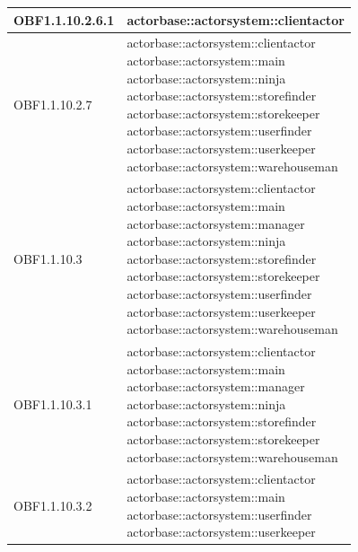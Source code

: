 \documentclass{scalatekids-article}
\begin{document}
\begin{longtable}[H]{|p{6cm}|p{11cm}|}
\hline
OBF1.1.10.2.6.1 & \multiLineCell[t]{actorbase::actorsystem::clientactor\\}\\
\hline
OBF1.1.10.2.7 & \multiLineCell[t]{actorbase::actorsystem::clientactor\\actorbase::actorsystem::main\\actorbase::actorsystem::ninja\\actorbase::actorsystem::storefinder\\actorbase::actorsystem::storekeeper\\actorbase::actorsystem::userfinder\\actorbase::actorsystem::userkeeper\\actorbase::actorsystem::warehouseman\\}\\
\hline
OBF1.1.10.3 & \multiLineCell[t]{actorbase::actorsystem::clientactor\\actorbase::actorsystem::main\\actorbase::actorsystem::manager\\actorbase::actorsystem::ninja\\actorbase::actorsystem::storefinder\\actorbase::actorsystem::storekeeper\\actorbase::actorsystem::userfinder\\actorbase::actorsystem::userkeeper\\actorbase::actorsystem::warehouseman\\}\\
\hline
OBF1.1.10.3.1 & \multiLineCell[t]{actorbase::actorsystem::clientactor\\actorbase::actorsystem::main\\actorbase::actorsystem::manager\\actorbase::actorsystem::ninja\\actorbase::actorsystem::storefinder\\actorbase::actorsystem::storekeeper\\actorbase::actorsystem::warehouseman\\}\\
\hline
OBF1.1.10.3.2 & \multiLineCell[t]{actorbase::actorsystem::clientactor\\actorbase::actorsystem::main\\actorbase::actorsystem::userfinder\\actorbase::actorsystem::userkeeper\\}\\

\end{longtable}
\end{document}
